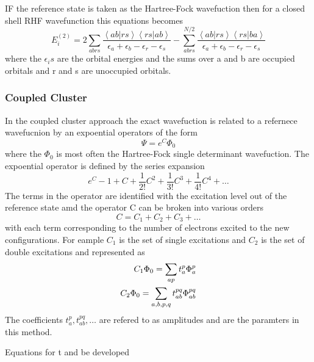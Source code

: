   IF the reference state is taken as the Hartree-Fock wavefuction then for a closed shell RHF wavefunction this equations becomes
\begin{equation}
E_i^{(2)} = 2 \sum_{abrs} { \frac{\left\langle ab|rs \right\rangle \left\langle  rs|ab \right\rangle }{\epsilon_a + \epsilon_b - \epsilon_r - \epsilon_s} } - \sum_{abrs}^{N/2} { \frac{\left\langle ab|rs\right\rangle \left\langle rs|ba \right\rangle }{\epsilon_a + \epsilon_b - \epsilon_r - \epsilon_s} }
\end{equation}
where the $\epsilon_i s$ are the orbital energies and the sums over a and b are occupied orbitals and r and s are unoccupied orbitals.

\subsubsection{Coupled Cluster}
In the coupled cluster approach the exact wavefuction is related to a refernece wavefucnion by an expoential operators of the form
\begin{equation}
\Psi = e^C\Phi_0
\end{equation}
where the $\Phi_0$ is most often the Hartree-Fock single determinant wavefuction.  The expoential operator is defined by the series expansion
\begin{equation}
e^C - 1 + C + \frac{1}{2!}C^2 + \frac{1}{3!}C^3 + \frac{1}{4!}C^4 + \ldots
\end{equation}
The terms in the operator are identified with the excitation level out of the reference state amd the operator C can be broken into various orders
\begin{equation}
C = C_1 + C_2 + C_3 + \ldots
\end{equation}
with each term corresponding to the number of electrons excited to the new configurations.  For eample $C_1$ is the set of single excitations and $C_2$ is the set of double excitations and represented as
\begin{align}
C_1\Phi_0 = \sum_{ap}t_a^p\Phi_a^p \notag \\
C_2\Phi_0 = \sum_{a,b,p,q}t_{ab}^{pq}\Phi_{ab}^{pq}
\end{align}
The coefficients $t_a^p, t_{ab}^{pq}, \ldots$ are refered to as amplitudes and are the paramters in this method.

Equations for t and be developed

